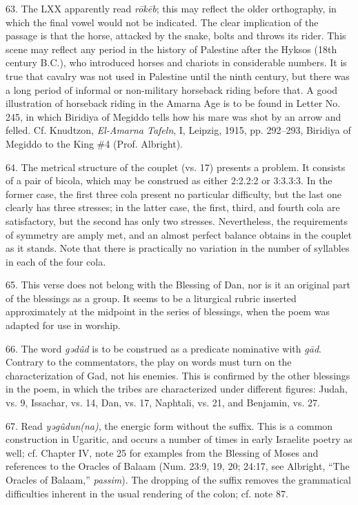 \begin{enumerate}
63. The LXX apparently read \emph{rōkēb}; this may reflect the older
orthography, in which the final vowel would not be indicated. The clear
implication of the passage is that the horse, attacked by the snake, bolts and
throws its rider. This scene may reflect any period in the history of Palestine
after the Hyksos (18th century B.C.), who introduced horses and chariots in
considerable numbers. It is true that cavalry was not used in Palestine until
the ninth century, but there was a long period of informal or non-military
horseback riding before that. A good illustration of horseback riding in the
Amarna Age is to be found in Letter No. 245, in which Biridiya of Megiddo tells
how his mare was shot by an arrow and felled. Cf. Knudtzon, \emph{El-Amarna
Tafeln}, I, Leipzig, 1915, pp. 292--293, Biridiya of Megiddo to the King \#4
(Prof. Albright).

64. The metrical structure of the couplet (vs. 17) presents a problem. It
consists of a pair of bicola, which may be construed as either 2:2.2:2 or
3:3.3:3. In the former case, the first three cola present no particular
difficulty, but the last one clearly has three stresses; in the latter case,
the first, third, and fourth cola are satisfactory, but the second has only two
stresses. Nevertheless, the requirements of symmetry are amply met, and an
almost perfect balance obtains in the couplet as it stands. Note that there is
practically no variation in the number of syllables in each of the four cola.

65. This verse does not belong with the Blessing of Dan, nor is it an original
part of the blessings as a group. It seems to be a liturgical rubric inserted
approximately at the midpoint in the series of blessings, when the poem was
adapted for use in worship.

66. The word \emph{gədûd} is to be construed as a predicate nominative with
\emph{gād}. Contrary to the commentators, the play on words must turn on the
characterization of Gad, not his enemies. This is confirmed by the other
blessings in the poem, in which the tribes are characterized under different
figures: Judah, vs. 9, Issachar, vs. 14, Dan, vs. 17, Naphtali, vs. 21, and
Benjamin, vs. 27.

67. Read \emph{yəgûdun(na)}, the energic form without the suffix. This is a
common construction in Ugaritic, and occurs a number of times in early
Israelite poetry as well; cf. Chapter IV, note 25 for examples from the
Blessing of Moses and references to the Oracles of Balaam (Num. 23:9, 19, 20;
24:17, see Albright, ``The Oracles of Balaam,'' \emph{passim}). The dropping
of the suffix removes the grammatical difficulties inherent in the usual
rendering of the colon; cf. note 87.


\end{enumerate}
